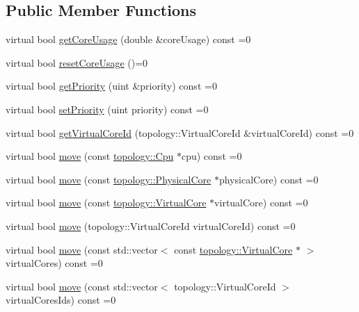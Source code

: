 \subsection*{Public Member Functions}
\begin{DoxyCompactItemize}
\item 
virtual bool \hyperlink{classmammut_1_1task_1_1Task_a4649012d8b17e09dc9270b61ad296d91}{get\-Core\-Usage} (double \&core\-Usage) const =0
\item 
virtual bool \hyperlink{classmammut_1_1task_1_1Task_a07b164a46a147eb76af005fa23e39826}{reset\-Core\-Usage} ()=0
\item 
virtual bool \hyperlink{classmammut_1_1task_1_1Task_a4ff24fb8519aef63e9fd0848f065733d}{get\-Priority} (uint \&priority) const =0
\item 
virtual bool \hyperlink{classmammut_1_1task_1_1Task_a6ca8b0fb237d41bdae18dd5d98ed4012}{set\-Priority} (uint priority) const =0
\item 
virtual bool \hyperlink{classmammut_1_1task_1_1Task_a8f8b0d63ca29856427735e93b039ea24}{get\-Virtual\-Core\-Id} (topology\-::\-Virtual\-Core\-Id \&virtual\-Core\-Id) const =0
\item 
virtual bool \hyperlink{classmammut_1_1task_1_1Task_a9f7366c0e1f4c0b9f02e453d18ec41a5}{move} (const \hyperlink{classmammut_1_1topology_1_1Cpu}{topology\-::\-Cpu} $\ast$cpu) const =0
\item 
virtual bool \hyperlink{classmammut_1_1task_1_1Task_ae9137276cf4b4440a66b7b310bd51466}{move} (const \hyperlink{classmammut_1_1topology_1_1PhysicalCore}{topology\-::\-Physical\-Core} $\ast$physical\-Core) const =0
\item 
virtual bool \hyperlink{classmammut_1_1task_1_1Task_a10937944c3534c4b5a21b584c9ceafb8}{move} (const \hyperlink{classmammut_1_1topology_1_1VirtualCore}{topology\-::\-Virtual\-Core} $\ast$virtual\-Core) const =0
\item 
virtual bool \hyperlink{classmammut_1_1task_1_1Task_a461a62415be252aaf4868ee781b09220}{move} (topology\-::\-Virtual\-Core\-Id virtual\-Core\-Id) const =0
\item 
virtual bool \hyperlink{classmammut_1_1task_1_1Task_afb35378fa3ebdbb92aa2875530b9cb64}{move} (const std\-::vector$<$ const \hyperlink{classmammut_1_1topology_1_1VirtualCore}{topology\-::\-Virtual\-Core} $\ast$ $>$ virtual\-Cores) const =0
\item 
virtual bool \hyperlink{classmammut_1_1task_1_1Task_af6bd70528163acb0e1c5becc7bdca326}{move} (const std\-::vector$<$ topology\-::\-Virtual\-Core\-Id $>$ virtual\-Cores\-Ids) const =0
\end{DoxyCompactItemize}


